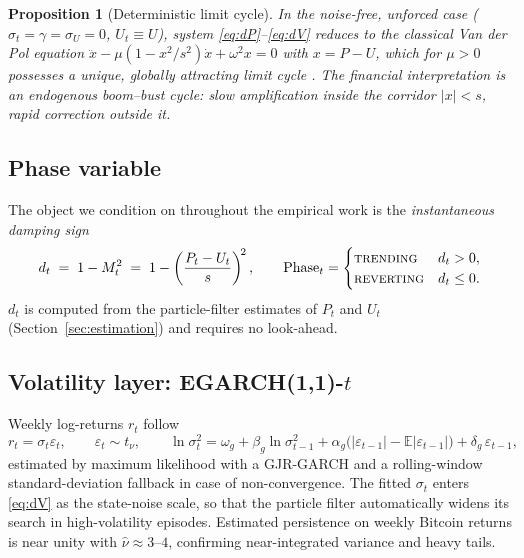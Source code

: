 \documentclass[11pt,a4paper]{article}
\newtheorem{proposition}{Proposition}
\newcommand{\E}{\mathbb{E}}
\begin{document}
\begin{proposition}[Deterministic limit cycle]
In the noise-free, unforced case ($\sigma_t = \gamma = \sigma_U = 0$, $U_t \equiv U$), system \eqref{eq:dP}--\eqref{eq:dV} reduces to the classical Van der Pol equation $\ddot{x} - \mu(1-x^2/s^2)\dot{x} + \omega^2 x = 0$ with $x = P - U$, which for $\mu > 0$ possesses a unique, globally attracting limit cycle \citep{vanderpol1926}. The financial interpretation is an endogenous boom--bust cycle: slow amplification inside the corridor $|x|<s$, rapid correction outside it.
\end{proposition}

\subsection{Phase variable}

The object we condition on throughout the empirical work is the \emph{instantaneous damping sign}
\begin{equation}
d_t \;=\; 1 - M_t^2 \;=\; 1 - \left(\frac{P_t - U_t}{s}\right)^{\!2},
\qquad
\text{Phase}_t =
\begin{cases}
\textsc{trending} & d_t > 0,\\
\textsc{reverting} & d_t \le 0.
\end{cases}
\label{eq:phase}
\end{equation}
$d_t$ is computed from the particle-filter estimates of $P_t$ and $U_t$ (Section~\ref{sec:estimation}) and requires no look-ahead.

\subsection{Volatility layer: EGARCH(1,1)-$t$}\label{sec:garch}

Weekly log-returns $r_t$ follow
\begin{equation}
r_t = \sigma_t \varepsilon_t, \qquad \varepsilon_t \sim t_\nu, \qquad
\ln \sigma_t^2 = \omega_g + \beta_g \ln \sigma_{t-1}^2
+ \alpha_g\big(|\varepsilon_{t-1}| - \E|\varepsilon_{t-1}|\big) + \delta_g\,\varepsilon_{t-1},
\end{equation}
estimated by maximum likelihood with a GJR-GARCH and a rolling-window standard-deviation fallback in case of non-convergence. The fitted $\sigma_t$ enters \eqref{eq:dV} as the state-noise scale, so that the particle filter automatically widens its search in high-volatility episodes. Estimated persistence on weekly Bitcoin returns is near unity with $\hat\nu \approx 3$--$4$, confirming near-integrated variance and heavy tails.
\end{document}
